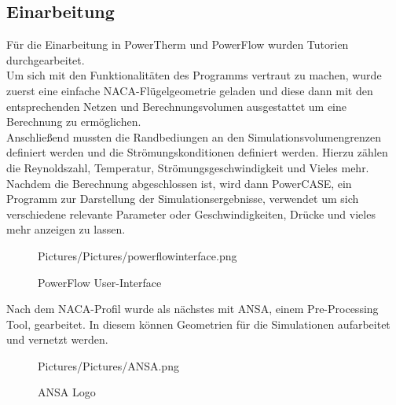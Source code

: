 \subsection{Einarbeitung}
\label{Einarbeitung}

Für die Einarbeitung in PowerTherm und PowerFlow wurden Tutorien durchgearbeitet.\\
Um sich mit den Funktionalitäten des Programms vertraut zu machen, wurde zuerst eine einfache NACA-Flügelgeometrie geladen und diese dann mit den entsprechenden Netzen und Berechnungsvolumen ausgestattet um eine Berechnung zu ermöglichen. \\
Anschließend mussten die Randbediungen an den Simulationsvolumengrenzen definiert werden und die Strömungskonditionen definiert werden. Hierzu zählen die Reynoldszahl, Temperatur, Strömungsgeschwindigkeit und Vieles mehr.\\

Nachdem die Berechnung abgeschlossen ist, wird dann PowerCASE, ein Programm zur Darstellung der Simulationsergebnisse, verwendet um sich verschiedene relevante Parameter oder Geschwindigkeiten, Drücke und vieles mehr anzeigen zu lassen. 

\begin{figure}[H]
	\begin{center}
		\begin{overpic}[width=\linewidth]{Pictures/Pictures/powerflowinterface.png}
			
		\end{overpic}
	
	\caption{PowerFlow User-Interface}
	\label{PowerFlowUI}
	\end{center}
\end{figure}

Nach dem NACA-Profil wurde als nächstes mit ANSA, einem Pre-Processing Tool, gearbeitet. In diesem können Geometrien für die Simulationen aufarbeitet und vernetzt werden. \\

\begin{figure}[H]
	\begin{center}
		\begin{overpic}[width=\linewidth]{Pictures/Pictures/ANSA.png}
			
		\end{overpic}
	
	\caption{ANSA Logo}
	\label{ansa}
	\end{center}
\end{figure}

